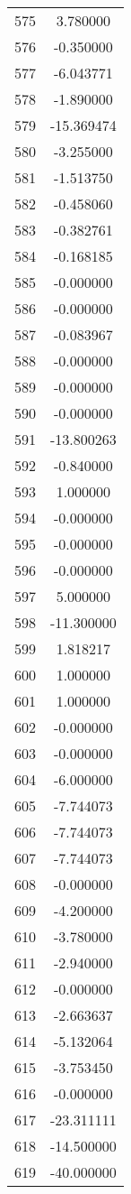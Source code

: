 \documentclass[12pt]{article}
\begin{document}
\begin{longtable}{@{}cc@{}}
575 & 3.780000 \\
576 & -0.350000 \\
577 & -6.043771 \\
578 & -1.890000 \\
579 & -15.369474 \\
580 & -3.255000 \\
581 & -1.513750 \\
582 & -0.458060 \\
583 & -0.382761 \\
584 & -0.168185 \\
585 & -0.000000 \\
586 & -0.000000 \\
587 & -0.083967 \\
588 & -0.000000 \\
589 & -0.000000 \\
590 & -0.000000 \\
591 & -13.800263 \\
592 & -0.840000 \\
593 & 1.000000 \\
594 & -0.000000 \\
595 & -0.000000 \\
596 & -0.000000 \\
597 & 5.000000 \\
598 & -11.300000 \\
599 & 1.818217 \\
600 & 1.000000 \\
601 & 1.000000 \\
602 & -0.000000 \\
603 & -0.000000 \\
604 & -6.000000 \\
605 & -7.744073 \\
606 & -7.744073 \\
607 & -7.744073 \\
608 & -0.000000 \\
609 & -4.200000 \\
610 & -3.780000 \\
611 & -2.940000 \\
612 & -0.000000 \\
613 & -2.663637 \\
614 & -5.132064 \\
615 & -3.753450 \\
616 & -0.000000 \\
617 & -23.311111 \\
618 & -14.500000 \\
619 & -40.000000 \\

\end{longtable}
\end{document}
